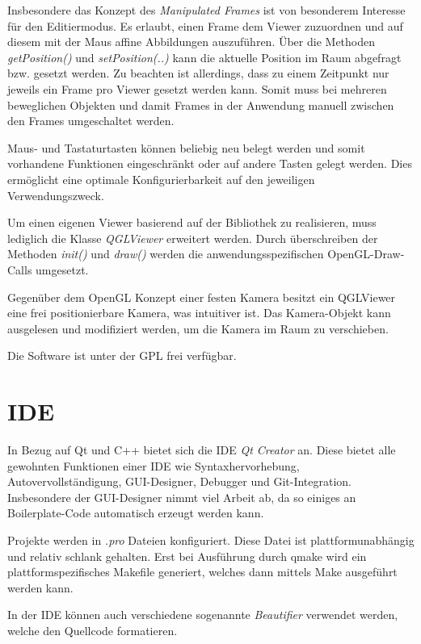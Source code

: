 Insbesondere das Konzept des \emph{Manipulated Frames} ist von besonderem Interesse für den Editiermodus. 
Es erlaubt, einen Frame dem Viewer zuzuordnen und auf diesem mit der Maus affine Abbildungen auszuführen.
Über die Methoden \emph{getPosition()} und \emph{setPosition(..)} kann die aktuelle Position im Raum abgefragt bzw. gesetzt werden.
Zu beachten ist allerdings, dass zu einem Zeitpunkt nur jeweils ein Frame pro Viewer gesetzt werden kann.
Somit muss bei mehreren beweglichen Objekten und damit Frames in der Anwendung manuell zwischen den Frames umgeschaltet werden.

Maus- und Tastaturtasten können beliebig neu belegt werden und somit vorhandene Funktionen eingeschränkt oder auf andere Tasten gelegt werden.
Dies ermöglicht eine optimale Konfigurierbarkeit auf den jeweiligen Verwendungszweck.

Um einen eigenen Viewer basierend auf der Bibliothek zu realisieren, muss lediglich die Klasse \emph{QGLViewer} erweitert werden.
Durch überschreiben der Methoden \emph{init()} und \emph{draw()} werden die anwendungsspezifischen OpenGL-Draw-Calls umgesetzt.

Gegenüber dem OpenGL Konzept einer festen Kamera \cite{OpenGLCamera} besitzt ein QGLViewer eine frei positionierbare Kamera, was intuitiver ist.
Das Kamera-Objekt kann ausgelesen und modifiziert werden, um die Kamera im Raum zu verschieben.

Die Software ist unter der GPL frei verfügbar.

\section{IDE} 

In Bezug auf Qt und C++ bietet sich die IDE \emph{Qt Creator} \cite{QtCreator} an. 
Diese bietet alle gewohnten Funktionen einer IDE wie Syntaxhervorhebung, Autovervollständigung, GUI-Designer, Debugger und Git-Integration.
Insbesondere der GUI-Designer nimmt viel Arbeit ab, da so einiges an Boilerplate-Code automatisch erzeugt werden kann.

Projekte werden in \emph{.pro} Dateien konfiguriert. 
Diese Datei ist plattformunabhängig und relativ schlank gehalten. 
Erst bei Ausführung durch qmake wird ein plattformspezifisches Makefile generiert, welches dann mittels Make ausgeführt werden kann.

In der IDE können auch verschiedene sogenannte \emph{Beautifier} verwendet werden, welche den Quellcode formatieren.

